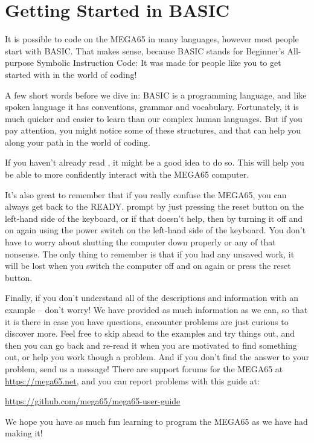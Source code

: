 \chapter{Getting Started in BASIC}
\label{cha:basic-getting-started}

It is possible to code on the MEGA65 in many languages,
however most people start with BASIC.  That makes sense,
because BASIC stands for Beginner's All-purpose Symbolic
Instruction Code: It was made for people like you to get
started with in the world of coding!

A few short words before we dive in: BASIC is a programming
language, and like spoken language it has conventions, grammar
and vocabulary.  Fortunately, it is much quicker and easier
to learn than our complex human languages. But if you pay
attention, you might notice some of these structures, and that
can help you along your path in the world of coding.

If you haven't already read ,
it might be a good idea to do so. This will help you be able to
more confidently interact with the MEGA65 computer.

It's also great to remember that if you really confuse the MEGA65,
you can always get back to the READY. prompt by just pressing the
reset button on the left-hand side of the keyboard, or if that
doesn't help, then by turning it off
and on again using the power switch on the left-hand side of the keyboard.
You don't have to worry about shutting the computer
down properly or any of that nonsense.  The only thing to remember
is that if you had any unsaved work, it will be lost when you switch
the computer off and on again or press the reset button.

Finally, if you don't understand all of the descriptions and information
with an example -- don't worry! We have provided as much information
as we can, so that it is there in case you have questions, encounter problems are
just curious to discover more.  Feel free to skip ahead to the examples
and try things out, and then you can go back and re-read it when you are motivated
to find something out, or help you work though a problem.  And if you don't find
the answer to your problem, send us a message!  There are support forums for the
MEGA65 at \url{https://mega65.net}, and you can
report problems with this guide at:

\url{https://github.com/mega65/mega65-user-guide}

We hope you have as much fun learning to program the MEGA65 as
we have had making it!

